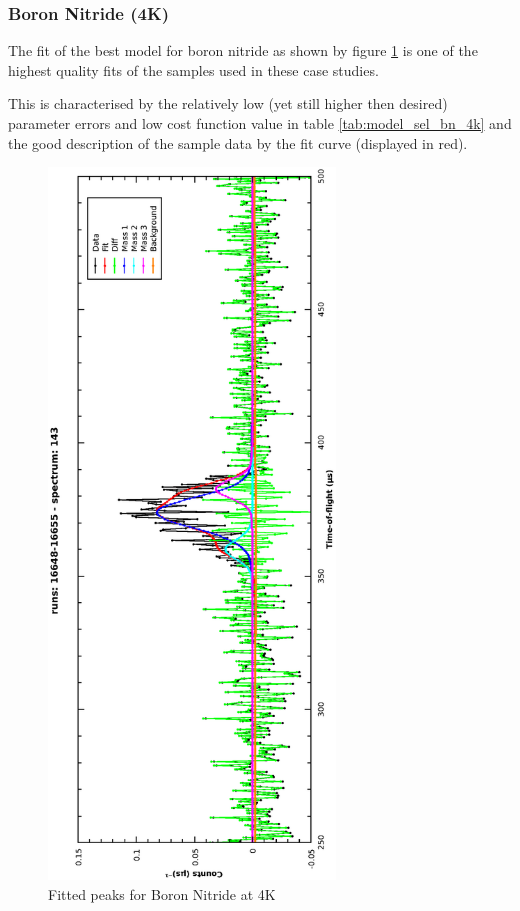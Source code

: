 \documentclass[a4paper]{article}
\begin{document}
\subsubsection{Boron Nitride (4K)}

The fit of the best model for boron nitride as shown by figure
\ref{fig:model_sel_bn_4k} is one of the highest quality fits of the samples used
in these case studies.

This is characterised by the relatively low (yet still higher then desired)
parameter errors and low cost function value in table \ref{tab:model_sel_bn_4k}
and the good description of the sample data by the fit curve (displayed in red).

\begin{figure}[h!]
  \centering
  \vspace{-60pt}
  \begin{turn}{-90}
    \includegraphics[width=0.68\textwidth]{graphics/model_sel_bn_4k.eps}
  \end{turn}
  \vspace{-60pt}
  \caption{Fitted peaks for Boron Nitride at 4K}
  \label{fig:model_sel_bn_4k}
\end{figure}
\FloatBarrier
\end{document}

